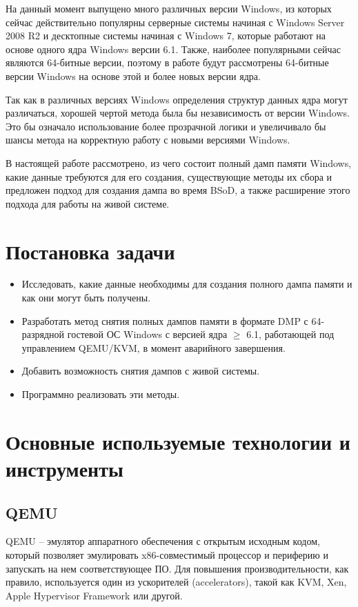 \documentclass{mipt-thesis-bs}
\begin{document}
На данный момент выпущено много различных версии Windows, из которых сейчас действительно популярны серверные системы начиная с Windows Server 2008 R2 и десктопные системы начиная с Windows 7, которые работают на основе одного ядра Windows версии 6.1. Также, наиболее популярными сейчас являются 64-битные версии, поэтому в работе будут рассмотрены 64-битные версии Windows на основе этой и более новых версии ядра.

Так как в различных версиях Windows определения структур данных ядра могут различаться\cite{kprcb}\cite{win10-struct}, хорошей чертой метода была бы независимость от версии Windows. Это бы означало использование более прозрачной логики и увеличивало бы шансы метода на корректную работу с новыми версиями Windows.

В настоящей работе рассмотрено, из чего состоит полный дамп памяти Windows, какие данные требуются для его создания, существующие методы их сбора и предложен подход для создания дампа во время BSoD, а также расширение этого подхода для работы на живой системе.

\chapter{Постановка задачи}

\begin{itemize}
\item Исследовать, какие данные необходимы для создания полного дампа памяти и как они могут быть получены.
\item Разработать метод снятия полных дампов памяти в формате DMP с 64-разрядной гостевой ОС Windows с версией ядра $\geqslant$ 6.1, работающей под управлением QEMU/KVM, в момент аварийного завершения.
\item Добавить возможность снятия дампов с живой системы.
\item Программно реализовать эти методы.
\end{itemize}

\chapter{Основные используемые технологии и инструменты}

\section*{QEMU}

QEMU -- эмулятор аппаратного обеспечения с открытым исходным кодом, который позволяет эмулировать x86-совместимый процессор и периферию и запускать на нем соответствующее ПО\cite{qemu-bellard}. Для повышения производительности, как правило, используется один из ускорителей (accelerators), такой как KVM, Xen, Apple Hypervisor Framework или другой\cite{qemu-ibm}.
\end{document}
